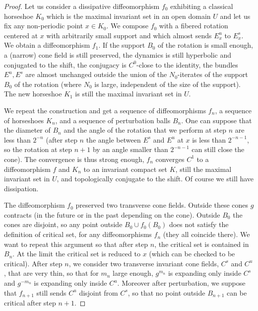 \documentclass[a4paper,11pt]{article}
\theoremstyle{definition}
\begin{document}
\begin{proof}
    Let us consider a dissipative diffeomorphism $f_0$ exhibiting a  classical horseshoe $K_0$ 
which is the maximal invariant set in an open domain $U$
and let us fix any non-periodic point $x\in K_0$.
We compose $f_0$ with a fibered rotation centered at $x$ with arbitrarily small
support and which almost sends $E^u_x$ to $E^s_x$.
We obtain a diffeomorphism $f_1$.
If the support $B_0$ of the rotation is small enough, a (narrow) cone field is still preserved,
the dynamics is still hyperbolic and conjugated to the shift,
the conjugacy is $C^0$-close to the identity,
the bundles $E^u,E^s$ are almost unchanged outside
the union of the $N_0$-iterates of the support $B_0$ of the rotation (where $N_0$ is large,
independent of the size of the support).
The new horseshoe $K_1$ is still the maximal invariant set in $U$.

We repeat the construction and get a sequence of diffeomorphisms $f_n$,
a sequence of horseshoes $K_n$, and a sequence of perturbation balls $B_n$.
One can suppose that the diameter of $B_n$ and the angle of the rotation that we perform at step $n$
are less than $2^{-n}$ (after step $n$ the angle between $E^s$ and $E^u$
at $x$ is less than $2^{-n-1}$, so the rotation at step $n+1$ by an angle
smaller than $2^{-n-1}$ can still close the cone).
The convergence is thus strong enough, $f_n$ converges $C^1$ to
a diffeomorphism $f$ and $K_n$ to an invariant compact set $K$,
still the maximal invariant set in $U$,
and topologically conjugate to the shift.
Of course we still have dissipation.

The diffeomorphism $f_0$ preserved two transverse cone fields.
Outside these cones $g$ contracts (in the future or in the past depending on the cone).
Outside $B_0$ the cones are disjoint, so any point outside $B_0\cup f_0(B_0)$
does not satisfy the definition of critical set, for any diffeomorphisms $f_n$
(they all coincide there).
We want to repeat this argument so that after step $n$,
the critical set is contained in $B_n$. At the limit the critical set is reduced
to $x$ (which can be checked to be critical).
After step $n$, we consider two transverse invariant cone fields,  $C^s$ and $C^u$,
that are very thin, so that for $m_n$ large enough,
$g^{m_n}$ is expanding only inside $C^s$ and $g^{-m_n}$ is expanding only inside $C^u$.
Moreover after perturbation, we suppose that $f_{n+1}$ still sends $C^u$
disjoint from $C^s$, so that no point outside $B_{n+1}$ can be critical after step $n+1$.
\end{proof}
\end{document}
